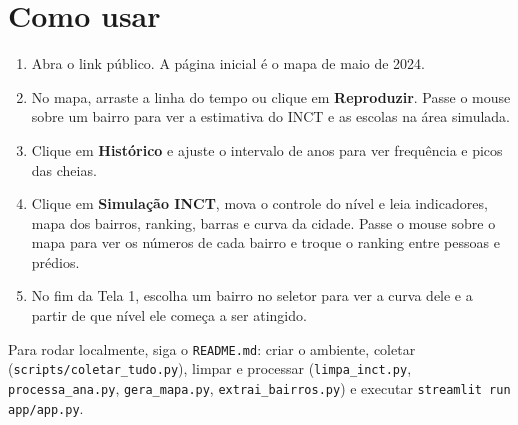 \documentclass[11pt,a4paper]{article}
\begin{document}
\section{Como usar}
\begin{enumerate}
  \item Abra o link público. A página inicial é o mapa de maio de 2024.
  \item No mapa, arraste a linha do tempo ou clique em \textbf{Reproduzir}. Passe o mouse sobre um bairro para ver a estimativa do INCT e as escolas na área simulada.
  \item Clique em \textbf{Histórico} e ajuste o intervalo de anos para ver frequência e picos das cheias.
  \item Clique em \textbf{Simulação INCT}, mova o controle do nível e leia indicadores, mapa dos bairros, ranking, barras e curva da cidade. Passe o mouse sobre o mapa para ver os números de cada bairro e troque o ranking entre pessoas e prédios.
  \item No fim da Tela 1, escolha um bairro no seletor para ver a curva dele e a partir de que nível ele começa a ser atingido.
\end{enumerate}
Para rodar localmente, siga o \texttt{README.md}: criar o ambiente, coletar (\texttt{scripts/coletar\_tudo.py}), limpar e processar (\texttt{limpa\_inct.py}, \texttt{processa\_ana.py}, \texttt{gera\_mapa.py}, \texttt{extrai\_bairros.py}) e executar \texttt{streamlit run app/app.py}.
\end{document}

